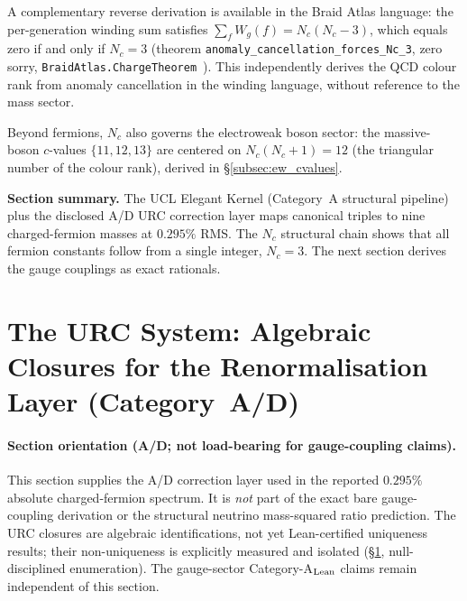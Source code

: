 \documentclass[11pt]{article}
\theoremstyle{remark}
\begin{document}
\smallskip
A complementary reverse derivation is available in the Braid Atlas language: the per-generation winding sum satisfies $\sum_f W_g(f) = N_c(N_c - 3)$, which equals zero if and only if $N_c = 3$ (theorem \texttt{anomaly\_cancellation\_forces\_Nc\_3}, zero sorry, \texttt{BraidAtlas.ChargeTheorem}~\cite{SpivackBraidAtlas}).  This independently derives the QCD colour rank from anomaly cancellation in the winding language, without reference to the mass sector.

Beyond fermions, $N_c$ also governs the electroweak boson sector: the massive-boson $c$-values $\{11,12,13\}$ are centered on $N_c(N_c{+}1) = 12$ (the triangular number of the colour rank), derived in \S\ref{subsec:ew_cvalues}.

\begin{tcolorbox}[colback=gray!4,colframe=gray!40,left=5pt,right=5pt,top=3pt,bottom=3pt]
\small\textbf{Section summary.}
The UCL Elegant Kernel (Category~A structural pipeline) plus the disclosed A/D URC correction layer maps canonical triples to nine charged-fermion masses at $0.295\%$ RMS.  The $N_c$ structural chain shows that all fermion constants follow from a single integer, $N_c = 3$.
The next section derives the gauge couplings as exact rationals.
\end{tcolorbox}

\section{The URC System: Algebraic Closures for the Renormalisation Layer (Category~A/D)}
\label{sec:urc}

\paragraph{Section orientation (A/D; not load-bearing for gauge-coupling claims).}
This section supplies the A/D correction layer used in the reported $0.295\%$ absolute charged-fermion spectrum.
It is \emph{not} part of the exact bare gauge-coupling derivation or the structural neutrino mass-squared ratio prediction.
The URC closures are algebraic identifications, not yet Lean-certified uniqueness results; their non-uniqueness is explicitly measured and isolated (\S\ref{sec:urc}, null-disciplined enumeration).
The gauge-sector Category-A$_{\rm Lean}$ claims remain independent of this section.
\end{document}
